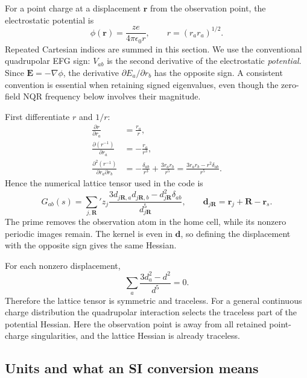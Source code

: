 \documentclass[11pt,a4paper]{article}
\newcommand{\rvec}{\bm r}
\begin{document}
For a point charge at a displacement $\rvec$ from the observation point, the
electrostatic potential is
\begin{equation}
 \phi(\rvec)=\frac{ze}{4\pi\epsilon_0 r},\qquad
 r=(r_a r_a)^{1/2}.
\end{equation}
Repeated Cartesian indices are summed in this section. We use the conventional
quadrupolar EFG sign: $V_{ab}$ is the second derivative of the electrostatic
\emph{potential}. Since $\bm E=-\nabla\phi$, the derivative
$\partial E_a/\partial r_b$ has the opposite sign. A consistent convention is
essential when retaining signed eigenvalues, even though the zero-field NQR
frequency below involves their magnitude.

First differentiate $r$ and $1/r$:
\begin{align}
 \frac{\partial r}{\partial r_a}&=\frac{r_a}{r},\\
 \frac{\partial (r^{-1})}{\partial r_a}&=-\frac{r_a}{r^3},\\
 \frac{\partial^2(r^{-1})}{\partial r_a\partial r_b}
 &=-\frac{\delta_{ab}}{r^3}+\frac{3r_a r_b}{r^5}
 =\frac{3r_a r_b-r^2\delta_{ab}}{r^5}.
\label{eq:kernel}
\end{align}
Hence the numerical lattice tensor used in the code is
\begin{equation}
 G_{ab}(s)=\sum_{j,\bm R}'z_j
 \frac{3d_{j\bm R,a}d_{j\bm R,b}
 -d_{j\bm R}^2\delta_{ab}}{d_{j\bm R}^5},\qquad
 \bm d_{j\bm R}=\rvec_j+\bm R-\rvec_s.
\label{eq:direct}
\end{equation}
The prime removes the observation atom in the home cell, while its nonzero
periodic images remain. The kernel is even in $\bm d$, so defining the
displacement with the opposite sign gives the same Hessian.

For each nonzero displacement,
\begin{equation}
 \sum_a\frac{3d_a^2-d^2}{d^5}=0.
\end{equation}
Therefore the lattice tensor is symmetric and traceless. For a general continuous
charge distribution the quadrupolar interaction selects the traceless part of
the potential Hessian. Here the observation point is away from all retained
point-charge singularities, and the lattice Hessian is already traceless.

\subsection{Units and what an SI conversion means}
\end{document}
